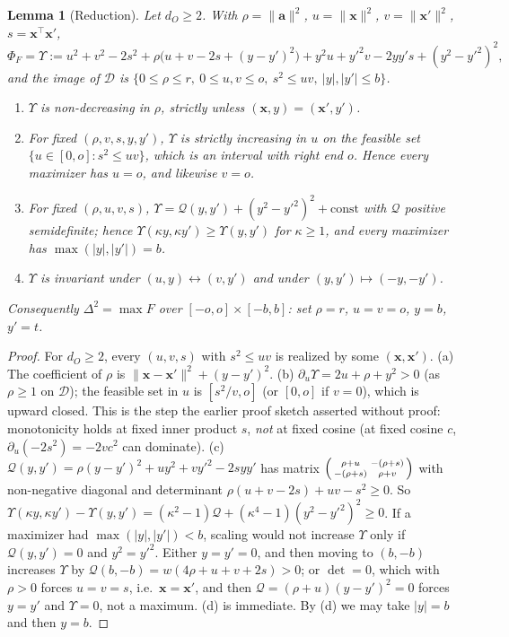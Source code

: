 \documentclass[11pt]{article}
\theoremstyle{definition}
\theoremstyle{plain}
\newtheorem{lemma}[definition]{Lemma}
\newcommand{\bx}{\mathbf{x}}
\newcommand{\ba}{\mathbf{a}}
\begin{document}
\begin{lemma}[Reduction]\label{lem:red}
Let $d_O\ge2$. With $\rho=\|\ba\|^2$, $u=\|\bx\|^2$, $v=\|\bx'\|^2$, $s=\bx^\top\bx'$,
\[
  \Phi_F=\Upsilon:=u^2+v^2-2s^2+\rho\bigl(u+v-2s+(y-y')^2\bigr)+y^2u+y'^2v-2yy's+(y^2-y'^2)^2,
\]
and the image of $\mathcal D$ is $\{0\le\rho\le r,\ 0\le u,v\le o,\ s^2\le uv,\ |y|,|y'|\le b\}$.
\begin{enumerate}[label=(\alph*),nosep]
  \item $\Upsilon$ is non-decreasing in $\rho$, strictly unless $(\bx,y)=(\bx',y')$.
  \item For fixed $(\rho,v,s,y,y')$, $\Upsilon$ is strictly increasing in $u$ on the feasible set $\{u\in[0,o]:s^2\le uv\}$, which is an interval with right end $o$. Hence every maximizer has $u=o$, and likewise $v=o$.
  \item For fixed $(\rho,u,v,s)$, $\Upsilon=\mathcal Q(y,y')+(y^2-y'^2)^2+\mathrm{const}$ with $\mathcal Q$ positive semidefinite; hence $\Upsilon(\kappa y,\kappa y')\ge\Upsilon(y,y')$ for $\kappa\ge1$, and every maximizer has $\max(|y|,|y'|)=b$.
  \item $\Upsilon$ is invariant under $(u,y)\leftrightarrow(v,y')$ and under $(y,y')\mapsto(-y,-y')$.
\end{enumerate}
Consequently $\Delta^2=\max F$ over $[-o,o]\times[-b,b]$: set $\rho=r$, $u=v=o$, $y=b$, $y'=t$.
\end{lemma}
\begin{proof}
For $d_O\ge2$, every $(u,v,s)$ with $s^2\le uv$ is realized by some $(\bx,\bx')$. (a) The coefficient of $\rho$ is $\|\bx-\bx'\|^2+(y-y')^2$. (b) $\partial_u\Upsilon=2u+\rho+y^2>0$ (as $\rho\ge1$ on $\mathcal D$); the feasible set in $u$ is $[s^2/v,o]$ (or $[0,o]$ if $v=0$), which is upward closed. This is the step the earlier proof sketch asserted without proof: monotonicity holds at fixed inner product $s$, \emph{not} at fixed cosine (at fixed cosine $c$, $\partial_u(-2s^2)=-2vc^2$ can dominate). (c) $\mathcal Q(y,y')=\rho(y-y')^2+uy^2+vy'^2-2syy'$ has matrix $\begin{psmallmatrix}\rho+u&-(\rho+s)\\-(\rho+s)&\rho+v\end{psmallmatrix}$ with non-negative diagonal and determinant $\rho(u+v-2s)+uv-s^2\ge0$. So $\Upsilon(\kappa y,\kappa y')-\Upsilon(y,y')=(\kappa^2-1)\mathcal Q+(\kappa^4-1)(y^2-y'^2)^2\ge0$. If a maximizer had $\max(|y|,|y'|)<b$, scaling would not increase $\Upsilon$ only if $\mathcal Q(y,y')=0$ and $y^2=y'^2$. Either $y=y'=0$, and then moving to $(b,-b)$ increases $\Upsilon$ by $\mathcal Q(b,-b)=w(4\rho+u+v+2s)>0$; or $\det=0$, which with $\rho>0$ forces $u=v=s$, i.e.\ $\bx=\bx'$, and then $\mathcal Q=(\rho+u)(y-y')^2=0$ forces $y=y'$ and $\Upsilon=0$, not a maximum. (d) is immediate. By (d) we may take $|y|=b$ and then $y=b$.
\end{proof}
\end{document}
